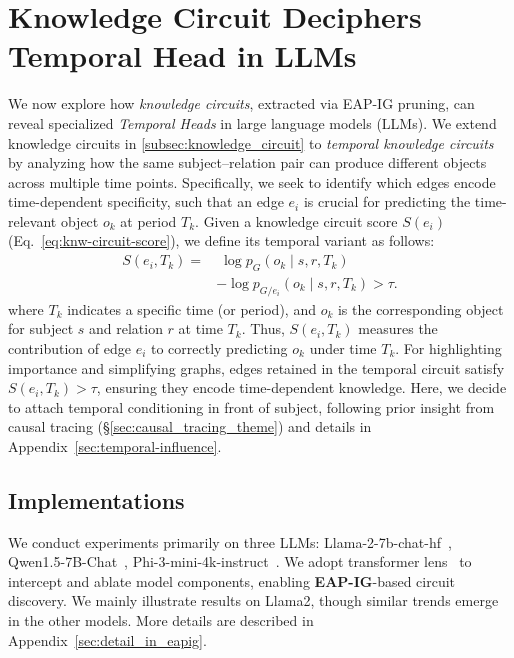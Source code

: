 \section{Knowledge Circuit Deciphers Temporal Head in LLMs}
\label{sec:knw-circuit-reuse}
We now explore how \emph{knowledge circuits}, extracted via EAP-IG pruning, can reveal specialized \emph{Temporal Heads} in large language models (LLMs). 
We extend knowledge circuits in \ref{subsec:knowledge_circuit} to 
\emph{temporal knowledge circuits} by analyzing how the same subject--relation pair can produce different objects across multiple time points. 
Specifically, we seek to identify which edges encode time-dependent specificity, such that an edge $e_i$ is crucial for predicting the time-relevant object $o_k$ at period $T_k$.
Given a knowledge circuit score $S(e_i)$ (Eq.~\ref{eq:knw-circuit-score}), 
we define its temporal variant as follows:
\begin{equation}
\begin{split}
S(e_i, T_k) = &\; \log p_G(o_k \mid s,r,T_k) \\
& - \log p_{G/e_i}(o_k \mid s,r,T_k) > \tau.
\end{split}
\end{equation}
where $T_k$ indicates a specific time (or period), and $o_k$ is the corresponding object for subject $s$ and relation $r$ at time $T_k$. 
Thus, $S(e_i, T_k)$ measures the contribution of edge $e_i$ to correctly predicting $o_k$ under time $T_k$.
For highlighting importance and simplifying graphs, edges retained in the temporal circuit satisfy $S(e_i, T_k) > \tau$, ensuring they encode time-dependent knowledge. 
Here, we decide to attach temporal conditioning in front of subject, following prior insight from causal tracing (\S\ref{sec:causal_tracing_theme}) and details in Appendix~\ref{sec:temporal-influence}.

\subsection{Implementations}
\label{subsec:impl}
We conduct experiments primarily on three LLMs: Llama-2-7b-chat-hf~\citep{llama2}, Qwen1.5-7B-Chat~\citep{qwen, qwen1.5}, Phi-3-mini-4k-instruct~\citep{phi3}.
We adopt transformer lens~\citep{transformerlens} to intercept and ablate model components, enabling \textbf{EAP-IG}-based circuit discovery.
We mainly illustrate results on Llama2, though similar trends emerge in the other models.
More details are described in Appendix~\ref{sec:detail_in_eapig}.

